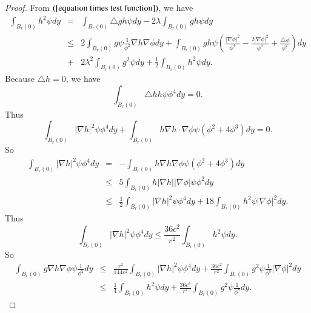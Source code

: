 \documentclass[a4paper, 12pt, onecolumn]{article} \textwidth 148mm
\begin{document}
\begin{proof}
From $(\ref{equation times test function})$, we have
\begin{eqnarray*}
\int_{B_r(0)}h^2\psi dy&=&\int_{B_r(0)}\triangle gh\psi dy-2\lambda\int_{B_r(0)}gh\psi dy
\\&\leq&2\int_{B_r(0)}g\psi \frac{1}{\phi^2}\nabla h\nabla\phi dy
+\int_{B_r(0)}gh\psi \left(\frac{|\nabla\phi|^2}{\phi^4}-\frac{2|\nabla\phi|^2}{\phi^3}
+\frac{\triangle\phi}{\phi^2}\right)dy
\\&+&2\lambda^2\int_{B_r(0)}g^2\psi dy+\frac{1}{2}\int_{B_r(0)}h^2\psi dy.
\end{eqnarray*}
Because $\triangle h=0$, we have
\begin{equation*}
\int_{B_r(0)}\triangle hh\psi\phi^4dy=0.
\end{equation*}
Thus
\begin{equation}\label{another midel case}
\int_{B_r(0)}|\nabla h|^2\psi\phi^4dy+\int_{B_r(0)}h\nabla h\cdot\nabla\phi \psi\left(\phi^2+4\phi^3\right)dy=0.
\end{equation}
So
\begin{eqnarray}\label{midel case}
\int_{B_r(0)}|\nabla h|^2\psi\phi^4dy&=&-\int_{B_r(0)}h\nabla h\nabla\phi \psi\left(\phi^2+4\phi^3\right)dy
\\\nonumber
&\leq&
5\int_{B_r(0)}h|\nabla h||\nabla\phi| \psi\phi^2dy
\\&\leq&\frac{1}{2}\int_{B_r(0)}|\nabla h|^2\psi\phi^4dy
+18\int_{B_r(0)}h^2\psi|\nabla\phi|^2dy.
\end{eqnarray}
Thus
\begin{equation*}
\int_{B_r(0)}|\nabla h|^2\psi\phi^4dy\leq\frac{36c^2}{r^2}\int_{B_r(0)}h^2\psi dy.
\end{equation*}
So
\begin{eqnarray*}
\int_{B_r(0)}g\nabla h\nabla\phi \psi\frac{1}{\phi^2}dy
&\leq&
\frac{r^2}{144c^2}\int_{B_r(0)}|\nabla h|^2\psi\phi^4dy
+\frac{36c^2}{r^2}\int_{B_r(0)}g^2\psi\frac{1}{\phi^8}|\nabla\phi|^2dy
\\&\leq&
\frac{1}{4}\int_{B_r(0)}h^2\psi dy
+\frac{36c^4}{r^4}\int_{B_r(0)}g^2\psi\frac{1}{\phi^8}dy.
\end{eqnarray*}


\end{proof}
\end{document}
